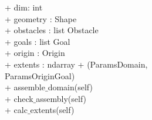 {
+ dim: int \\
+ geometry : Shape \\
+ obstacles : list Obstacle\\
+ goals : list Goal\\
+ origin : Origin\\
+ extents : ndarray
}
{
+ \dunder(ParamsDomain, \\
   ParamsOriginGoal) \\
+ assemble$\_$domain(self)\\
+ check$\_$assembly(self)\\
+ calc$\_$extents(self)
}